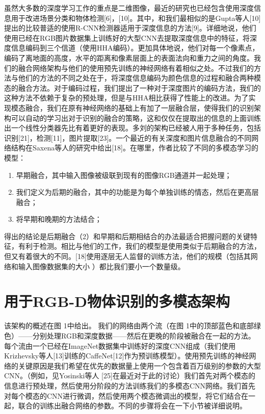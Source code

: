 虽然大多数的深度学习工作的重点是二维图像，最近的研究也已经包含使用深度信息用于改进场景分类和物体检测[6]，[10]。其中，和我们最相似的是Gupta等人[10]提出的比较普适的使用R-CNN检测器适用于深度信息的方法[9]。详细地说，他们使用已经在RGB图片数据集上训练好的大型CNN去提取深度信息中的特征，将深度信息编码到三个信道（使用HHA编码）。更加具体地说，他们对每一个像素点，编码了离地面的高度，水平的距离和像素层面上的表面法向和重力之间的角度。我们的融合网络架构与他们的使用预先训练的神经网络有着相似之处。不过我们的方法与他们的方法的不同之处在于，将深度信息编码为颜色信息的过程和融合两种模态的融合方法。对于编码过程，我们提出了一种对于深度图片的编码方法，我们的这种方法不依赖于复杂的预处理，但是与HHA相比获得了性能上的改进。为了实现模态融合，我们在原有神经网络的基础上有加了一层融合层，使得我们的识别架构可以自动的学习出对于识别的融合的策略，这和仅仅在提取出的信息的上面训练出一个线性分类器先比有着更好的表现。多刘的架构已经被人用于多种任务，包括识别[21]，检测[11]，图片提取[23]。一个最近的有关深度和图片信息融合的不同网络结构在Saxena等人的研究中给出[18]。在哪里，作者比较了不同的多模态学习的模型：
\begin{enumerate}
\item 早期融合，其中输入图像被级联到现有的图像RGB通道并一起处理；
\item 我们定义为后期的融合，其中的功能是为每个单独训练的情态，然后在更高层融合；
\item 将早期和晚期的方法结合；
\end{enumerate}
得出的结论是后期融合（2）和早期和后期相结合的办法最适合把握问题的关键特征，有利于检测。相比与他们的工作，我们的模型是使用类似于后期融合的方法，但又有着很大的不同。[18]使用逐层无人监督的训练方法，他们的规模（包括其网络和输入图像数据集的大小
）都比我们要小一个数量级。

\section{用于RGB-D物体识别的多模态架构}

该架构的概述在图 1中给出。 我们的网络由两个流（在图 1中的顶部蓝色和底部绿色）——分别处理RGB和深度数据——然后在更晚的阶段被融合在一起的方法。每个流由一个已经在ImageNet数据集中训练好的深度CNN组成（我们使用Krizhevsky等人[13]训练的CaffeNet[12]作为预训练模型）。使用预先训练的神经网络的关键原因是我们希望在优先的数据量上使用一个包含着百万级别的参数的大型CNN。（例如，见Yosinski等人 [25]在最近对于此的讨论）我们首先对两个模态的信息进行预处理，然后使用分阶段的方法训练我们的多模态CNN网络。我们首先对每个模态的CNN进行微调，然后使用两个模态微调出的模型，将它们结合在一起，联合的训练出融合网络的参数。不同的步骤将会在一下小节被详细说明。

